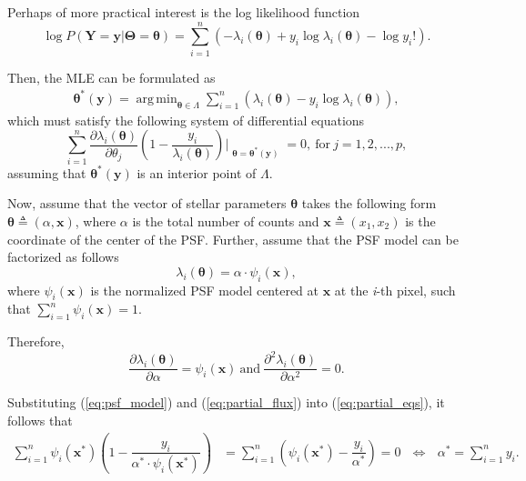 \documentclass{rnaastex}
\DeclareMathOperator*{\argmin}{arg\,min}
\begin{document}
Perhaps of more practical interest is the log likelihood function
\begin{equation}
    \log P(\bm{Y} = \bm{y} | \bm{\Theta} = \bm{\theta}) = \sum_{i=1}^{n}\left(- \lambda_i(\bm{\theta}) + y_i\log\lambda_i(\bm{\theta}) - \log y_i !\right).
\end{equation}

Then, the MLE can be formulated as
\begin{align}
    \bm{\theta}^{*}(\bm{y}) = \argmin_{\bm{\theta} \in \Lambda} \sum_{i=1}^{n}\left(\lambda_i(\bm{\theta}) - y_i\log\lambda_i(\bm{\theta})\right),
\end{align}
which must satisfy the following system of differential equations
\begin{equation}
    \sum_{i=1}^{n}\dfrac{\partial \lambda_i(\bm{\theta})}{\partial \theta_j}\left(1 - \dfrac{y_i}{\lambda_i(\bm{\theta})} \right)\Bigr|_{\substack{\bm{\theta}=\bm{\theta}^{*}(\bm{y})}} = 0,~\mathrm{for}~j=1, 2, ..., p,
    \label{eq:partial_eqs}
\end{equation}
assuming that $\bm{\theta}^{*}(\bm{y})$ is an interior point of $\Lambda$.

Now, assume that the vector of stellar parameters $\bm{\theta}$ takes the following form $\bm{\theta} \triangleq (\alpha, \bm{x})$, where $\alpha$ is the total number of counts and $\bm{x} \triangleq (x_1, x_2)$ is the coordinate of the center of the PSF. Further, assume that the PSF model can be factorized as follows
\begin{equation}
    \lambda_i(\bm{\theta}) = \alpha\cdot\psi_i(\bm{x}),
    \label{eq:psf_model}
\end{equation}
where $\psi_i(\bm{x})$ is the normalized PSF model centered at $\bm{x}$ at the \textit{i}-th pixel, such
that $\sum_{i=1}^{n}\psi_i(\bm{x})=1$.

Therefore,
\begin{equation}
    \dfrac{\partial{\lambda_i(\bm{\theta})}}{\partial \alpha} = \psi_i(\bm{x})~\text{and}~
    \dfrac{\partial^2{\lambda_i(\bm{\theta})}}{\partial \alpha^2} = 0.
    \label{eq:partial_flux}
\end{equation}

Substituting (\ref{eq:psf_model}) and (\ref{eq:partial_flux}) into (\ref{eq:partial_eqs}), it follows that
\begin{align}
    \sum_{i=1}^{n} \psi_i(\bm{x}^{*})\left(1 - \dfrac{y_i}{\alpha^{*}\cdot\psi_i(\bm{x}^{*})} \right) &= \sum_{i=1}^{n} \left(\psi_i(\bm{x}^{*}) -  \dfrac{y_i}{\alpha^{*}}\right) = 0~~~\Leftrightarrow~~~\alpha^{*} = \sum_{i=1}^{n} y_i.
    \label{eq:tada}
\end{align}
\end{document}
